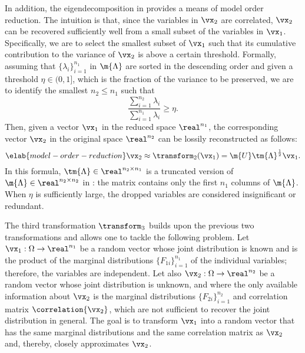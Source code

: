 In addition, the eigendecomposition in  provides a
means of model order reduction. The intuition is that, since the variables in
$\vx_2$ are correlated, $\vx_2$ can be recovered sufficiently well from a small
subset of the variables in $\vx_1$. Specifically, we are to select the smallest
subset of $\vx_1$ such that its cumulative contribution to the variance of
$\vx_2$ is above a certain threshold. Formally, assuming that $\{ \lambda_i
\}_{i = 1}^{n_1}$ in $\m{\Lambda}$ are sorted in the descending order and given
a threshold $\eta \in (0, 1]$, which is the fraction of the variance to be
preserved, we are to identify the smallest $n_2 \leq n_1$ such that
\[
  \frac{\sum_{i = 1}^{n_2} \lambda_i}{\sum_{i = 1}^{n_1} \lambda_i} \geq \eta.
\]
Then, given a vector $\vx_1$ in the reduced space $\real^{n_1}$, the
corresponding vector $\vx_2$ in the original space $\real^{n_2}$ can be lossily
reconstructed as follows:
\begin{equation} \elab{model-order-reduction}
  \vx_2 \approx \transform_2(\vx_1) = \m{U} \tm{\Lambda}^\frac{1}{2} \vx_1.
\end{equation}
In this formula, $\tm{\Lambda} \in \real^{n_2 \times n_1}$ is a truncated
version of $\m{\Lambda} \in \real^{n_2 \times n_2}$ in
: the matrix contains only the first $n_1$ columns of
$\m{\Lambda}$. When $\eta$ is sufficiently large, the dropped variables are
considered insignificant or redundant.

The third transformation $\transform_3$ builds upon the previous two
transformations and allows one to tackle the following problem. Let $\vx_1:
\Omega \to \real^{n_1}$ be a random vector whose joint distribution is known and
is the product of the marginal distributions $\{ F_{1i} \}_{i = 1}^{n_1}$ of the
individual variables; therefore, the variables are independent. Let also $\vx_2:
\Omega \to \real^{n_2}$ be a random vector whose joint distribution is unknown,
and where the only available information about $\vx_2$ is the marginal
distributions $\{ F_{2i} \}_{i = 1}^{n_2}$ and correlation matrix
$\correlation{\vx_2}$, which are not sufficient to recover the joint
distribution in general. The goal is to transform $\vx_1$ into a random vector
that has the same marginal distributions and the same correlation matrix as
$\vx_2$ and, thereby, closely approximates $\vx_2$.

